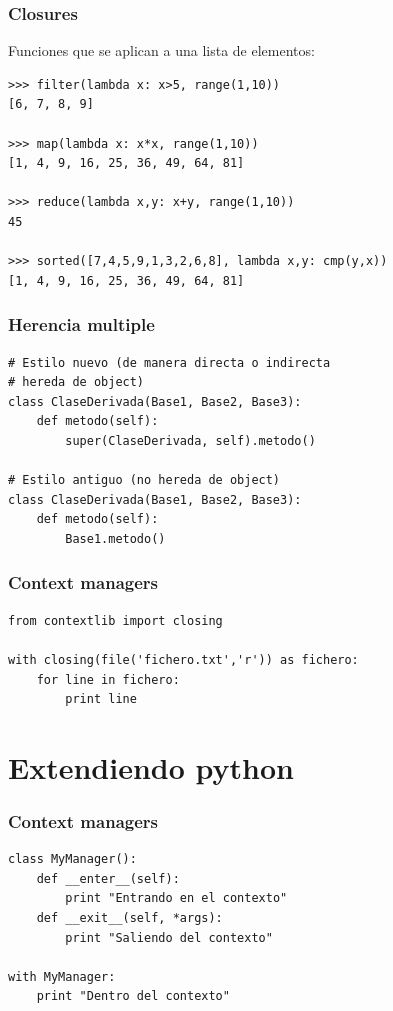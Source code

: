 \documentclass[10pt]{beamer}
\begin{document}
  \begin{frame}[containsverbatim]
    \frametitle{Closures}
Funciones que se aplican a una lista de elementos:
    \begin{verbatim}
>>> filter(lambda x: x>5, range(1,10))
[6, 7, 8, 9]

>>> map(lambda x: x*x, range(1,10))
[1, 4, 9, 16, 25, 36, 49, 64, 81]

>>> reduce(lambda x,y: x+y, range(1,10))
45

>>> sorted([7,4,5,9,1,3,2,6,8], lambda x,y: cmp(y,x))
[1, 4, 9, 16, 25, 36, 49, 64, 81]
    \end{verbatim}
  \end{frame}

  \begin{frame}[containsverbatim]
    \frametitle{Herencia multiple}
    \begin{verbatim}
# Estilo nuevo (de manera directa o indirecta
# hereda de object)
class ClaseDerivada(Base1, Base2, Base3):
    def metodo(self):
        super(ClaseDerivada, self).metodo()

# Estilo antiguo (no hereda de object)
class ClaseDerivada(Base1, Base2, Base3):
    def metodo(self):
        Base1.metodo()
    \end{verbatim}
  \end{frame}

  \begin{frame}[containsverbatim]
    \frametitle{Context managers}
    \begin{verbatim}
from contextlib import closing

with closing(file('fichero.txt','r')) as fichero:
    for line in fichero:
        print line
    \end{verbatim}
  \end{frame}

  \section{Extendiendo python}

  \begin{frame}[containsverbatim]
    \frametitle{Context managers}
    \begin{verbatim}
class MyManager():
    def __enter__(self):
        print "Entrando en el contexto"
    def __exit__(self, *args):
        print "Saliendo del contexto"

with MyManager:
    print "Dentro del contexto"
    \end{verbatim}
  \end{frame}
\end{document}
